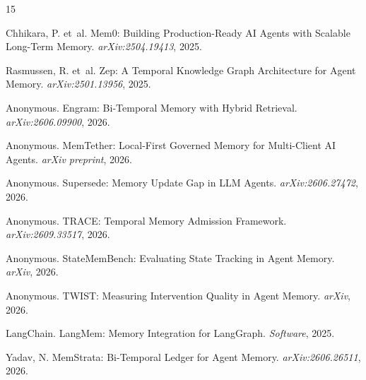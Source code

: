 \documentclass{article}
\begin{document}
\begin{thebibliography}{15}

Chhikara, P. et~al.
\newblock Mem0: Building Production-Ready AI Agents with Scalable Long-Term Memory.
\newblock \emph{arXiv:2504.19413}, 2025.

Rasmussen, R. et~al.
\newblock Zep: A Temporal Knowledge Graph Architecture for Agent Memory.
\newblock \emph{arXiv:2501.13956}, 2025.

Anonymous.
\newblock Engram: Bi-Temporal Memory with Hybrid Retrieval.
\newblock \emph{arXiv:2606.09900}, 2026.

Anonymous.
\newblock MemTether: Local-First Governed Memory for Multi-Client AI Agents.
\newblock \emph{arXiv preprint}, 2026.

Anonymous.
\newblock Supersede: Memory Update Gap in LLM Agents.
\newblock \emph{arXiv:2606.27472}, 2026.

Anonymous.
\newblock TRACE: Temporal Memory Admission Framework.
\newblock \emph{arXiv:2609.33517}, 2026.

Anonymous.
\newblock StateMemBench: Evaluating State Tracking in Agent Memory.
\newblock \emph{arXiv}, 2026.

Anonymous.
\newblock TWIST: Measuring Intervention Quality in Agent Memory.
\newblock \emph{arXiv}, 2026.

LangChain.
\newblock LangMem: Memory Integration for LangGraph.
\newblock \emph{Software}, 2025.

Yadav, N.
\newblock MemStrata: Bi-Temporal Ledger for Agent Memory.
\newblock \emph{arXiv:2606.26511}, 2026.

\end{thebibliography}
\end{document}
